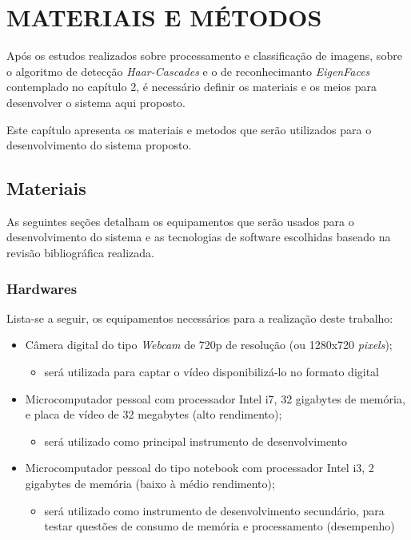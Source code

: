 
\chapter{MATERIAIS E MÉTODOS}\label{ch:materiais-metodos}
Após os estudos realizados sobre processamento e classificação de imagens, sobre o algoritmo de detecção \textit{Haar-Cascades} e o de reconhecimanto \textit{EigenFaces} contemplado no capítulo 2, é necessário definir os materiais e os meios para desenvolver o sistema aqui proposto.

Este capítulo apresenta os materiais e metodos que serão utilizados para o desenvolvimento do sistema proposto.


\section{Materiais}\label{sec: tec-ferramenta}
As seguintes seções detalham os equipamentos que serão usados para o desenvolvimento do sistema e as tecnologias de software escolhidas baseado na revisão bibliográfica realizada.

\subsection{Hardwares}\label{sub-hardw}
Lista-se a seguir, os equipamentos necessários para a realização deste trabalho:

\begin{itemize}
	
	\item Câmera digital do tipo \textit{Webcam} de 720p de resolução (ou 1280x720 \textit{pixels});
	\begin{itemize}
		\item será utilizada para captar o vídeo disponibilizá-lo no formato digital
	\end{itemize}

	\item Microcomputador pessoal com processador Intel i7, 32 gigabytes de memória, e placa de vídeo de 32 megabytes (alto rendimento);
	\begin{itemize}
		\item será utilizado como principal instrumento de desenvolvimento
	\end{itemize}
	
	\item Microcomputador pessoal do tipo notebook com processador Intel i3, 2 gigabytes de memória (baixo à médio rendimento);
	\begin{itemize}
		\item será utilizado como instrumento de desenvolvimento secundário, para testar questões de consumo de memória e processamento (desempenho)	
	\end{itemize}
	
\end{itemize}

